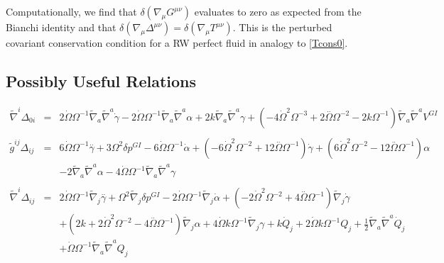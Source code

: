 \documentclass[10pt,letterpaper]{article}
\numberwithin{equation}{section}
\begin{document}
Computationally, we find that $\delta(\nabla_\mu G^{\mu \nu})$ evaluates to zero as expected from the Bianchi identity and that $\delta(\nabla_\mu \Delta^{\mu \nu})=\delta(\nabla_\mu T^{\mu \nu})$. This is the perturbed covariant conservation condition for a RW perfect fluid in analogy to \eqref{Tcons0}. 
%
%
%
%
\newpage
\begin{appendices}
\section{Possibly Useful Relations}
\begin{eqnarray}
\tilde\nabla^i\Delta_{0i}&=& 2 \dot{\Omega} \Omega^{-1} \tilde{\nabla}_{a}\tilde{\nabla}^{a}\dot{\gamma} - 2 \dot{\Omega} \Omega^{-1} \tilde{\nabla}_{a}\tilde{\nabla}^{a}\alpha + 2 k \tilde{\nabla}_{a}\tilde{\nabla}^{a}\gamma +(-4 \dot{\Omega}^2 \Omega^{-3} + 2 \overset{..}{\Omega} \Omega^{-2} - 2 k \Omega^{-1}) \tilde{\nabla}_{a}\tilde{\nabla}^{a}V^{GI}{}
\\  \nonumber\\ 
\tilde g^{ij}\Delta_{ij}&=& 6 \dot{\Omega} \Omega^{-1} \overset{..}{\gamma} + 3 \Omega^2 \delta p^{GI}{} - 6 \dot{\Omega} \Omega^{-1} \dot{\alpha} + (-6 \dot{\Omega}^2 \Omega^{-2} + 12 \overset{..}{\Omega} \Omega^{-1}) \dot{\gamma} + (6 \dot{\Omega}^2 \Omega^{-2} - 12 \overset{..}{\Omega} \Omega^{-1}) \alpha \nonumber \\ 
&& - 2 \tilde{\nabla}_{a}\tilde{\nabla}^{a}\alpha - 4 \dot{\Omega} \Omega^{-1} \tilde{\nabla}_{a}\tilde{\nabla}^{a}\gamma 
\\  \nonumber\\ 
\tilde\nabla^i\Delta_{ij}&=& 2 \dot{\Omega} \Omega^{-1} \tilde{\nabla}_{j}\overset{..}{\gamma} + \Omega^2 \tilde{\nabla}_{j}\delta p^{GI}{} - 2 \dot{\Omega} \Omega^{-1} \tilde{\nabla}_{j}\dot{\alpha} + (-2 \dot{\Omega}^2 \Omega^{-2} + 4 \overset{..}{\Omega} \Omega^{-1}) \tilde{\nabla}_{j}\dot{\gamma} \nonumber \\ 
&& + (2 k + 2 \dot{\Omega}^2 \Omega^{-2} - 4 \overset{..}{\Omega} \Omega^{-1}) \tilde{\nabla}_{j}\alpha + 4 \dot{\Omega} k \Omega^{-1} \tilde{\nabla}_{j}\gamma +k \dot{Q}_{j} + 2 \dot{\Omega} k \Omega^{-1} Q_{j} + \tfrac{1}{2} \tilde{\nabla}_{a}\tilde{\nabla}^{a}\dot{Q}_{j} \nonumber \\ 
&& + \dot{\Omega} \Omega^{-1} \tilde{\nabla}_{a}\tilde{\nabla}^{a}Q_{j}
\\  \nonumber\\ 

\end{eqnarray}
\end{appendices}
\end{document}
